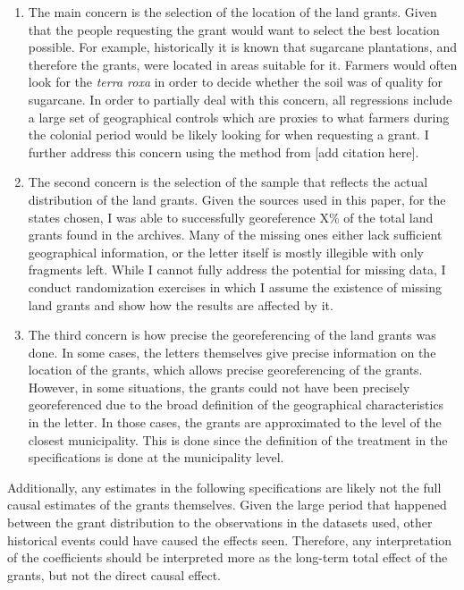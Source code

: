 \documentclass{article}
\begin{document}
\begin{enumerate}
  \item The main concern is the selection of the location of the land grants. Given that the people requesting the grant would want to select the best location possible. 
  For example, historically it is known that sugarcane plantations, and therefore the grants, were located in areas suitable for it. 
  Farmers would often look for the \textit{terra roxa} in order to decide whether the soil was of quality for sugarcane.
  In order to partially deal with this concern, all regressions include a large set of geographical controls which are proxies to what farmers during the colonial period would be likely looking for when requesting a grant. 
  I further address this concern using the method from [add citation here].
  \item The second concern is the selection of the sample that reflects the actual distribution of the land grants. 
  Given the sources used in this paper, for the states chosen, I was able to successfully georeference X\% of the total land grants found in the archives. 
  Many of the missing ones either lack sufficient geographical information, or the letter itself is mostly illegible with only fragments left.  
  While I cannot fully address the potential for missing data, I conduct randomization exercises in which I assume the existence of missing land grants and show how the results are affected by it. 
  \item The third concern is how precise the georeferencing of the land grants was done. 
  In some cases, the letters themselves give precise information on the location of the grants, which allows precise georeferencing of the grants.
  However, in some situations, the grants could not have been precisely georeferenced due to the broad definition of the geographical characteristics in the letter. 
  In those cases, the grants are approximated to the level of the closest municipality.  
  This is done since the definition of the treatment in the specifications is done at the municipality level.
\end{enumerate}

Additionally, any estimates in the following specifications are likely not the full causal estimates of the grants themselves. 
Given the large period that happened between the grant distribution to the observations in the datasets used, other historical events could have caused the effects seen. 
Therefore, any interpretation of the coefficients should be interpreted more as the long-term total effect of the grants, but not the direct causal effect.
\end{document}
